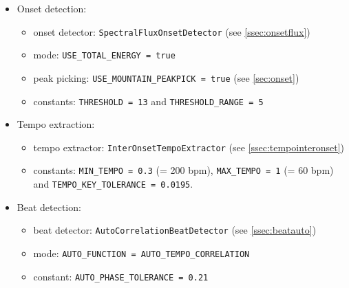\begin{itemize}
  \item Onset detection:
  \begin{itemize}
    \item onset detector: \texttt{SpectralFluxOnsetDetector} (see
    \ref{ssec:onsetflux})
    \item mode: \texttt{USE\_TOTAL\_ENERGY = true}
    \item peak picking: \texttt{USE\_MOUNTAIN\_PEAKPICK = true} (see
    \ref{sec:onset})
    \item constants: \texttt{THRESHOLD = 13} and \texttt{THRESHOLD\_RANGE = 5}
  \end{itemize}
  \item Tempo extraction:
  \begin{itemize}
    \item tempo extractor: \texttt{InterOnsetTempoExtractor} (see
    \ref{ssec:tempointeronset})
    \item constants: \texttt{MIN\_TEMPO = 0.3} (= 200 bpm), \texttt{MAX\_TEMPO =
    1} (= 60 bpm) and \texttt{TEMPO\_KEY\_TOLERANCE = 0.0195}.
  \end{itemize}
  \item Beat detection:
  \begin{itemize}
    \item beat detector: \texttt{AutoCorrelationBeatDetector} (see
    \ref{ssec:beatauto})
    \item mode: \texttt{AUTO\_FUNCTION = AUTO\_TEMPO\_CORRELATION}
    \item constant: \texttt{AUTO\_PHASE\_TOLERANCE = 0.21}
  \end{itemize}
\end{itemize}
